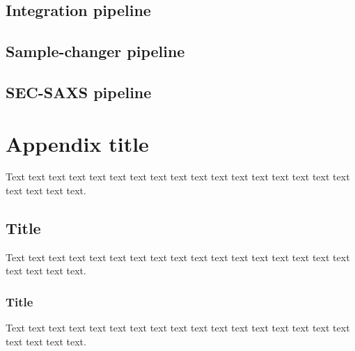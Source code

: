 \documentclass[preprint]{iucr}              %
\begin{document}
\subsection{Integration pipeline}
\subsection{Sample-changer pipeline}
\subsection{SEC-SAXS pipeline}


\appendix
\section{Appendix title}

Text text text text text text text text text text text text text text
text text text text text text text.

\subsection{Title}

Text text text text text text text text text text text text text text
text text text text text text text.

\subsubsection{Title}

Text text text text text text text text text text text text text text
text text text text text text text.





\end{document}
